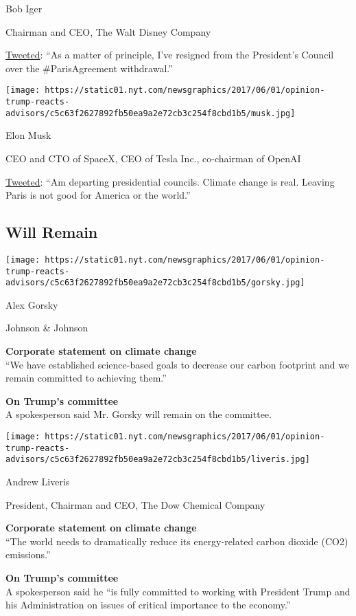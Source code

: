 Bob Iger

Chairman and CEO, The Walt Disney Company

\href{https://twitter.com/RobertIger/status/870413002893254656}{Tweeted}:
``As a matter of principle, I've resigned from the President's Council
over the \#ParisAgreement withdrawal.''

\texttt{[image: https://static01.nyt.com/newsgraphics/2017/06/01/opinion-trump-reacts-advisors/c5c63f2627892fb50ea9a2e72cb3c254f8cbd1b5/musk.jpg]}

Elon Musk

CEO and CTO of SpaceX, CEO of Tesla Inc., co-chairman of OpenAI

\href{https://twitter.com/elonmusk/status/870369915894546432}{Tweeted}:
``Am departing presidential councils. Climate change is real. Leaving
Paris is not good for America or the world.''

\hypertarget{will-remain}{%
\subsection{Will Remain}\label{will-remain}}

\texttt{[image: https://static01.nyt.com/newsgraphics/2017/06/01/opinion-trump-reacts-advisors/c5c63f2627892fb50ea9a2e72cb3c254f8cbd1b5/gorsky.jpg]}

Alex Gorsky

Johnson \& Johnson

\textbf{Corporate statement on climate change}\\
``We have established science-based goals to decrease our carbon
footprint and we remain committed to achieving them.''

\textbf{On Trump's committee}\\
A spokesperson said Mr. Gorsky will remain on the committee.

\texttt{[image: https://static01.nyt.com/newsgraphics/2017/06/01/opinion-trump-reacts-advisors/c5c63f2627892fb50ea9a2e72cb3c254f8cbd1b5/liveris.jpg]}

Andrew Liveris

President, Chairman and CEO, The Dow Chemical Company

\textbf{Corporate statement on climate change}\\
``The world needs to dramatically reduce its energy-related carbon
dioxide (CO2) emissions.''

\textbf{On Trump's committee}\\
A spokesperson said he ``is fully committed to working with President
Trump and his Administration on issues of critical importance to the
economy.''

